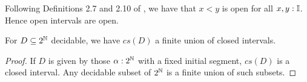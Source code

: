 %
%
%
\begin{remark}
  Following Definitions 2.7 and 2.10 of \cite{Bishop}, we have that $x<y$ is open for all $x,y:\mathbb{I}$. Hence open intervals are open. 
\end{remark}
%
\begin{lemma}\label{ImageDecidableClosedInterval}
  For $D\subseteq 2^{\mathbb{N}}$ decidable, we have $cs(D)$ a finite union of closed intervals. 
\end{lemma}
\begin{proof}
  If $D$ is given by those $\alpha:2^{\mathbb{N}}$ with a fixed initial segment, $cs(D)$ is a closed interval. 
  Any decidable subset of $2^{\mathbb{N}}$ is a finite union of such subsets. 
\end{proof}
